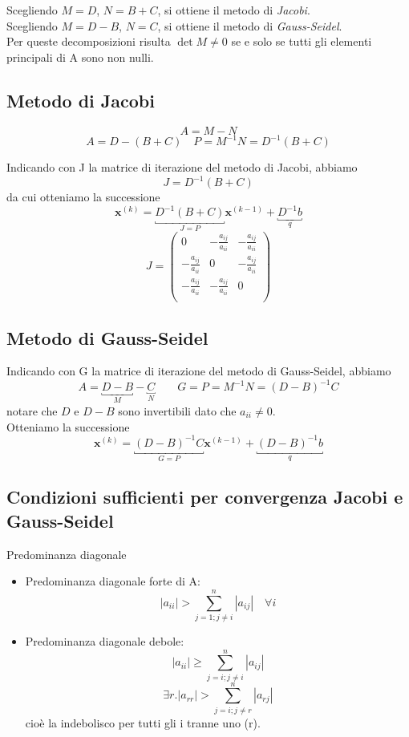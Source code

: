 Scegliendo $M = D$, $N = B + C$, si ottiene il metodo di \emph{Jacobi}.\\
Scegliendo $M = D − B$, $N = C$, si ottiene il metodo di \emph{Gauss-Seidel}.\\
Per queste decomposizioni risulta $\det M \neq 0$ se e solo se tutti gli
elementi principali di A sono non nulli.


\subsection{Metodo di Jacobi}

$$ A = M -N $$ 
$$ A = D - (B+C) \quad  P = M^{-1}N = D^{-1}(B+C)$$

Indicando con J la matrice di iterazione del metodo di Jacobi, abbiamo
$$ J = D^{-1} (B+C) $$
da cui otteniamo la successione
$$ \mathbf{x}^{(k)} = \underbracket{D^{-1} (B+C)}_{J=P} \mathbf{x}^{(k-1)} + \underbracket{D^{-1}b}_{q} $$
$$ J = 
\begin{pmatrix}
0                      & -\frac{a_{ij}}{a_{ii}} & -\frac{a_{ij}}{a_{ii}} \\
-\frac{a_{ij}}{a_{ii}} & 0                      & -\frac{a_{ij}}{a_{ii}} \\
-\frac{a_{ij}}{a_{ii}} & -\frac{a_{ij}}{a_{ii}} & 0                      \\
\end{pmatrix} $$

\subsection{Metodo di Gauss-Seidel}
Indicando con G la matrice di iterazione del metodo di Gauss-Seidel,
abbiamo
$$A = \underbracket{D-B}_{M} - \underbracket{C}_{N} \qquad G = P = M^{-1}N = (D-B)^{-1}C$$
notare che $D$ e $D - B$ sono invertibili dato che $a_{ii} \neq 0$.\\
Otteniamo la successione
$$ \mathbf{x}^{(k)} = \underbracket{(D-B)^{-1}C}_{G=P} \mathbf{x}^{(k-1)} + \underbracket{(D-B)^{-1} b}_{q}$$

\subsection{Condizioni sufficienti per convergenza Jacobi e Gauss-Seidel}
Predominanza diagonale
\begin{itemize}
 \item Predominanza diagonale forte di A: 
   $$ |a_{ii}| > \displaystyle \sum_{j=1; j \neq i}^{n} |a_{ij}| \quad
   \forall i $$ 
 \item Predominanza diagonale debole: 
   $$ |a_{ii}| \geq \displaystyle \sum_{j=i; j \neq i}^{n} |a_{ij}|$$ 
   $$ \exists r . |a_{rr}| > \displaystyle \sum_{j=i; j \neq r}^{n} | a_{rj}| $$ 
   cio\`e la indebolisco per tutti gli i tranne uno (r).
\end{itemize}

